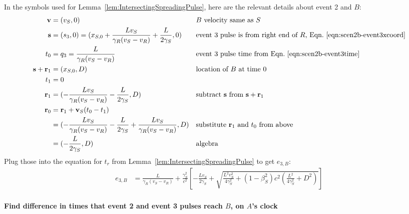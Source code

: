 \documentclass[a4paper]{article}
\theoremstyle{plain}
\theoremstyle{definition}
\newcommand{\vect}[1]{\mathbf{#1}}
\begin{document}
In the symbols used for Lemma~\ref{lem:IntersectingSpreadingPulse},
here are the relevant details about event 2 and $B$:
\begin{align*}
\vect{v} & = (v_S, 0) & & \text{$B$ velocity same as $S$} \\
\vect{s} & = (s_3,0) = (x_{S,0} + \frac{Lv_S}{\gamma_R(v_S - v_R)} + \frac{L}{2\gamma_S}, 0) & & \text{event 3 pulse is from right end of $R$, Eqn.~\eqref{eqn:scen2b-event3xcoord}} \\
t_0 & = q_3 = \frac{L}{\gamma_R(v_S - v_R)} & & \text{event 3 pulse time from Eqn.~\eqref{eqn:scen2b-event3time}} \\
\vect{s} + \vect{r}_1 & = (x_{S,0}, D) & & \text{location of $B$ at time 0} \\
t_1 & = 0 \\
\vect{r}_1 & = (-\frac{Lv_S}{\gamma_R(v_S - v_R)} - \frac{L}{2\gamma_S}, D) & & \text{subtract $\vect{s}$ from $\vect{s}+\vect{r}_1$} \\
\vect{r}_0
  & = \vect{r}_1 + \vect{v}_S(t_0-t_1) \\
  & = (-\frac{Lv_S}{\gamma_R(v_S - v_R)} - \frac{L}{2\gamma_S} + \frac{Lv_S}{\gamma_R(v_S - v_R)}, D) & & \text{substitute $\vect{r}_1$ and $t_0$ from above} \\
  & = (-\frac{L}{2\gamma_S}, D) & & \text{algebra}
\end{align*}
Plug those into the equation for $t_r$ from
Lemma~\ref{lem:IntersectingSpreadingPulse} to get $e_{3,B}$:
\begin{align*}
e_{3,B} & = \frac{L}{\gamma_R(v_S - v_R)} + \frac{\gamma_S^2}{c^2} \left[ -\frac{Lv_S}{2\gamma_S} + \sqrt{\frac{L^2v_S^2}{4\gamma_S^2} + (1-\beta_S^2)c^2 (\frac{L^2}{4\gamma_S^2} + D^2)} \right]
\end{align*}


\paragraph{Find difference in times that event 2 and event 3 pulses reach $B$, on $A$'s clock}
\end{document}
